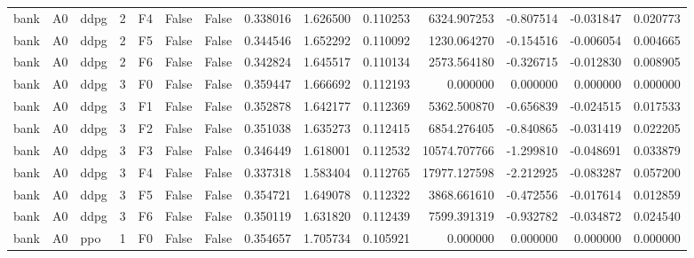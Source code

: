 \begin{tabular}{lllrlllrrrrrrr}
      bank &      A0 &      ddpg &     2 &  F4 &           False &            False &  0.338016 &  1.626500 & 0.110253 &      6324.907253 &          -0.807514 &       -0.031847 &            0.020773 \\
      bank &      A0 &      ddpg &     2 &  F5 &           False &            False &  0.344546 &  1.652292 & 0.110092 &      1230.064270 &          -0.154516 &       -0.006054 &            0.004665 \\
      bank &      A0 &      ddpg &     2 &  F6 &           False &            False &  0.342824 &  1.645517 & 0.110134 &      2573.564180 &          -0.326715 &       -0.012830 &            0.008905 \\
      bank &      A0 &      ddpg &     3 &  F0 &           False &            False &  0.359447 &  1.666692 & 0.112193 &         0.000000 &           0.000000 &        0.000000 &            0.000000 \\
      bank &      A0 &      ddpg &     3 &  F1 &           False &            False &  0.352878 &  1.642177 & 0.112369 &      5362.500870 &          -0.656839 &       -0.024515 &            0.017533 \\
      bank &      A0 &      ddpg &     3 &  F2 &           False &            False &  0.351038 &  1.635273 & 0.112415 &      6854.276405 &          -0.840865 &       -0.031419 &            0.022205 \\
      bank &      A0 &      ddpg &     3 &  F3 &           False &            False &  0.346449 &  1.618001 & 0.112532 &     10574.707766 &          -1.299810 &       -0.048691 &            0.033879 \\
      bank &      A0 &      ddpg &     3 &  F4 &           False &            False &  0.337318 &  1.583404 & 0.112765 &     17977.127598 &          -2.212925 &       -0.083287 &            0.057200 \\
      bank &      A0 &      ddpg &     3 &  F5 &           False &            False &  0.354721 &  1.649078 & 0.112322 &      3868.661610 &          -0.472556 &       -0.017614 &            0.012859 \\
      bank &      A0 &      ddpg &     3 &  F6 &           False &            False &  0.350119 &  1.631820 & 0.112439 &      7599.391319 &          -0.932782 &       -0.034872 &            0.024540 \\
      bank &      A0 &       ppo &     1 &  F0 &           False &            False &  0.354657 &  1.705734 & 0.105921 &         0.000000 &           0.000000 &        0.000000 &            0.000000 \\

\end{tabular}
